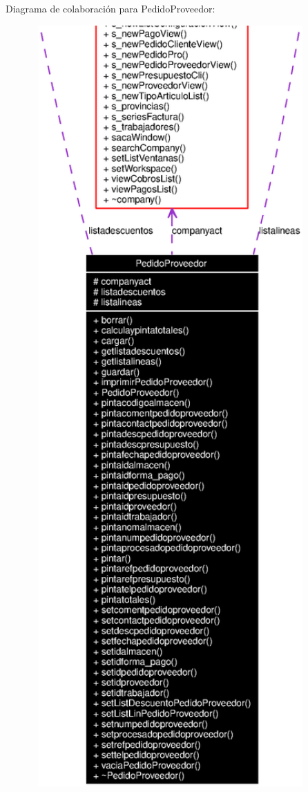Diagrama de colaboraci\'{o}n para Pedido\-Proveedor:\begin{figure}[H]
\begin{center}
\leavevmode
\includegraphics[width=298pt]{classPedidoProveedor__coll__graph}
\end{center}
\end{figure}
